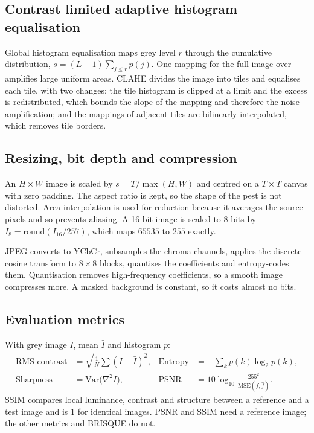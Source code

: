 \subsection{Contrast limited adaptive histogram equalisation}
Global histogram equalisation maps grey level $r$ through the cumulative distribution, $s = (L-1)\sum_{j\le r} p(j)$. One mapping for the full image over-amplifies large uniform areas. CLAHE \cite{zuiderveld1994} divides the image into tiles and equalises each tile, with two changes: the tile histogram is clipped at a limit and the excess is redistributed, which bounds the slope of the mapping and therefore the noise amplification; and the mappings of adjacent tiles are bilinearly interpolated, which removes tile borders.

\subsection{Resizing, bit depth and compression}
An $H\times W$ image is scaled by $s = T/\max(H,W)$ and centred on a $T\times T$ canvas with zero padding. The aspect ratio is kept, so the shape of the pest is not distorted. Area interpolation is used for reduction because it averages the source pixels and so prevents aliasing. A 16-bit image is scaled to 8 bits by $I_8 = \mathrm{round}(I_{16}/257)$, which maps $65535$ to $255$ exactly.

JPEG converts to YCbCr, subsamples the chroma channels, applies the discrete cosine transform to $8\times8$ blocks, quantises the coefficients and entropy-codes them. Quantisation removes high-frequency coefficients, so a smooth image compresses more. A masked background is constant, so it costs almost no bits.

\subsection{Evaluation metrics}
With grey image $I$, mean $\bar{I}$ and histogram $p$:
\begin{align}
\text{RMS contrast} &= \sqrt{\tfrac{1}{N}\textstyle\sum (I - \bar{I})^2}, &
\text{Entropy} &= -\textstyle\sum_{k} p(k)\log_2 p(k), \\
\text{Sharpness} &= \mathrm{Var}\bigl(\nabla^2 I\bigr), &
\text{PSNR} &= 10\log_{10}\frac{255^2}{\mathrm{MSE}(f,\hat{f})}.
\end{align}
SSIM \cite{wang2004} compares local luminance, contrast and structure between a reference and a test image and is 1 for identical images. PSNR and SSIM need a reference image; the other metrics and BRISQUE do not.

